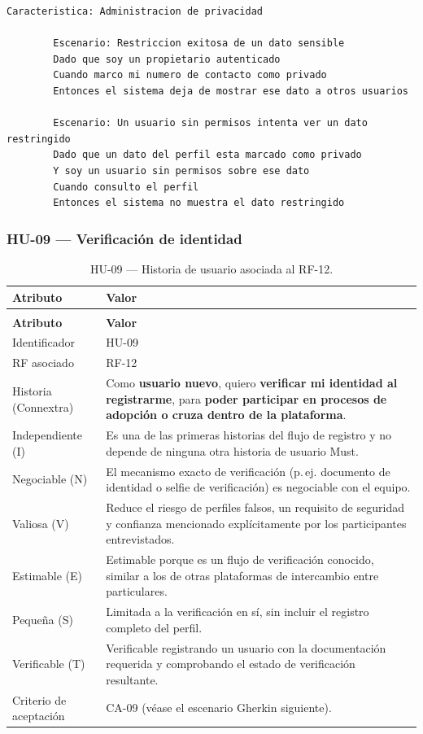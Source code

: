 \documentclass[journal,onecolumn]{IEEEtran}
\makeatletter
\newenvironment{atributos}[2]{%
	\small
	\begin{longtable}{@{}>{\raggedright\arraybackslash}p{4.2cm} >{\raggedright\arraybackslash}p{11.2cm}@{}}
		\caption{#2}\label{tab:#1}\\
		\toprule
		\textbf{Atributo} & \textbf{Valor} \\
		\midrule
		\endfirsthead
		\multicolumn{2}{@{}l}{\small\itshape (continuación)}\\
		\toprule
		\textbf{Atributo} & \textbf{Valor} \\
		\midrule
		\endhead
		\bottomrule
		\endlastfoot
	}{%
	\end{longtable}
	\normalsize
}
\makeatother
\begin{document}
	\begin{lstlisting}[style=gherkin,caption={CA-08 --- Escenario de aceptación de la historia HU-08.},label={lst:ca08}]
		Caracteristica: Administracion de privacidad
		
		Escenario: Restriccion exitosa de un dato sensible
		Dado que soy un propietario autenticado
		Cuando marco mi numero de contacto como privado
		Entonces el sistema deja de mostrar ese dato a otros usuarios
		
		Escenario: Un usuario sin permisos intenta ver un dato restringido
		Dado que un dato del perfil esta marcado como privado
		Y soy un usuario sin permisos sobre ese dato
		Cuando consulto el perfil
		Entonces el sistema no muestra el dato restringido
	\end{lstlisting}
	
	\subsubsection{HU-09 --- Verificación de identidad}
	
	\begin{atributos}{HU-09}{HU-09 --- Historia de usuario asociada al RF-12.}
		Identificador & HU-09 \\
		RF asociado & RF-12 \\
		Historia (Connextra) & Como \textbf{usuario nuevo}, quiero \textbf{verificar mi identidad al registrarme}, para \textbf{poder participar en procesos de adopción o cruza dentro de la plataforma}. \\
		Independiente (I) & Es una de las primeras historias del flujo de registro y no depende de ninguna otra historia de usuario Must. \\
		Negociable (N) & El mecanismo exacto de verificación (p.\,ej. documento de identidad o selfie de verificación) es negociable con el equipo. \\
		Valiosa (V) & Reduce el riesgo de perfiles falsos, un requisito de seguridad y confianza mencionado explícitamente por los participantes entrevistados. \\
		Estimable (E) & Estimable porque es un flujo de verificación conocido, similar a los de otras plataformas de intercambio entre particulares. \\
		Pequeña (S) & Limitada a la verificación en sí, sin incluir el registro completo del perfil. \\
		Verificable (T) & Verificable registrando un usuario con la documentación requerida y comprobando el estado de verificación resultante. \\
		Criterio de aceptación & CA-09 (véase el escenario Gherkin siguiente). \\
	\end{atributos}
	
\end{document}
